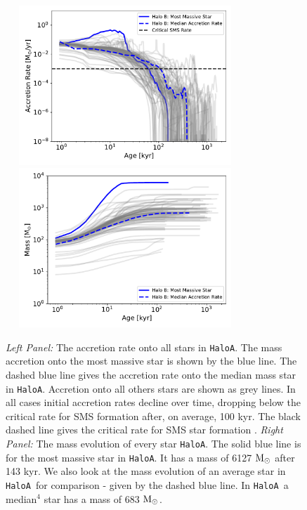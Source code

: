 \documentclass[twocolumn,iop,revtex4]{openjournal}
\newcommand{\msolar} {$\rm{M_{\odot}}~$}
\newcommand{\msolarc} {$\rm{M_{\odot}}$}
\newcommand{\ha} {\texttt{HaloA~}}
\newcommand{\hac} {\texttt{HaloA}}
\begin{document}
\begin{figure}
\centering
\begin{minipage}{175mm}      \begin{center}
    \centerline{
      \includegraphics[width=9.0cm, height=6cm]{FIGURES/AccretionRate_HaloA.pdf}
      \includegraphics[width=9.0cm, height=6cm]{FIGURES/Mass_HaloA.pdf}}
    \caption{
      \textit{Left Panel:} The accretion rate onto all stars in \hac. The mass accretion onto the
      most massive star is shown by the blue line. The dashed blue line gives the accretion
      rate onto the median mass star in \hac. Accretion onto all others stars are shown as grey lines.
      In all cases initial accretion rates decline over time, dropping below the critical rate
      for SMS formation after, on average, 100 kyr. The black dashed line gives the critical rate for SMS
      star formation \citep{Haemmerle_2017}.
      \textit{Right Panel:}  The mass evolution of every star \hac. The
      solid blue line is for the most massive star in \hac. It has a mass of
      6127 \msolar after 143 kyr. We also look at the mass evolution
      of an average star in \ha for comparison - given by the dashed blue line.
      In \ha a median$^4$ star has a mass of 683 \msolarc.
    }
\label{Fig:HaloA_AccretionRates}
\end{center} \end{minipage}
\end{figure}
\end{document}
